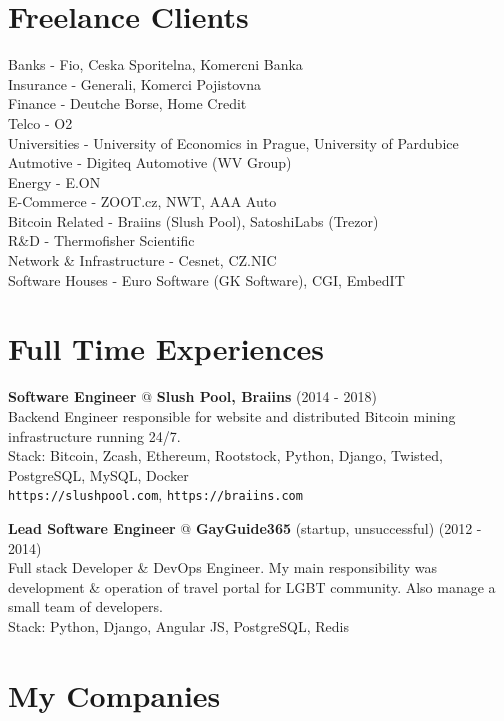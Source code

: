 \documentclass[12pt,a4paper]{article}
\begin{document}
\section*{Freelance Clients}
Banks - Fio, Ceska Sporitelna, Komercni Banka\\
Insurance - Generali, Komerci Pojistovna\\
Finance - Deutche Borse, Home Credit\\
Telco - O2\\
Universities - University of Economics in Prague, University of Pardubice\\
Autmotive - Digiteq Automotive (WV Group)\\
Energy - E.ON\\
E-Commerce - ZOOT.cz, NWT, AAA Auto\\
Bitcoin Related - Braiins (Slush Pool), SatoshiLabs (Trezor)\\
R\&D - Thermofisher Scientific\\
Network \& Infrastructure - Cesnet, CZ.NIC\\
Software Houses - Euro Software (GK Software), CGI, EmbedIT\\

\section*{Full Time Experiences}

{\bf Software Engineer} @ {\bf Slush Pool, Braiins} (2014 - 2018)\\
Backend Engineer responsible for website and distributed Bitcoin mining infrastructure running 24/7.\\
Stack: Bitcoin, Zcash, Ethereum, Rootstock, Python, Django, Twisted, PostgreSQL, MySQL, Docker\\
\texttt{https://slushpool.com}, \texttt{https://braiins.com}\\

\newpage

{\bf Lead Software Engineer} @ {\bf GayGuide365} (startup, unsuccessful) (2012 - 2014)\\
Full stack Developer \& DevOps Engineer. My main responsibility was development \& operation of travel portal for LGBT community. Also manage a small team of developers.\\
Stack: Python, Django, Angular JS, PostgreSQL, Redis\\

\section*{My Companies}
\end{document}

